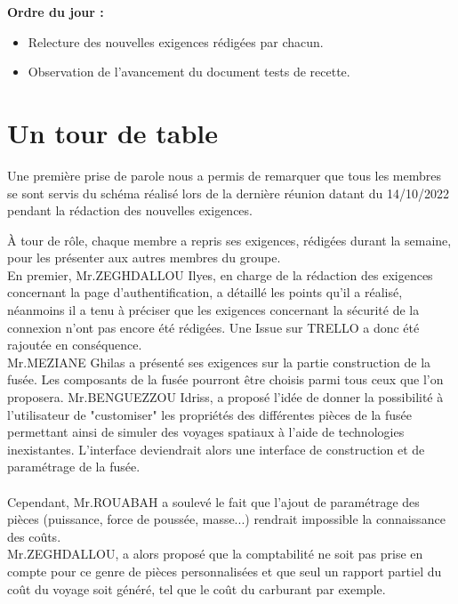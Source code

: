 \documentclass[a4paper, 12pt]{article}
\begin{document}
\textbf{Ordre du jour :}
 \begin{itemize}
     \item Relecture des nouvelles exigences rédigées par chacun. 
     \item Observation de l'avancement du document tests de recette.
 \end{itemize}


\section{Un tour de table}

Une première prise de parole nous a permis de remarquer que tous les membres se sont servis du schéma réalisé lors de la dernière réunion datant du 14/10/2022 pendant la rédaction des nouvelles exigences.

À tour de rôle, chaque membre a repris ses exigences, rédigées durant la semaine, pour les présenter aux autres membres du groupe.
\\

En premier, Mr.ZEGHDALLOU Ilyes, en charge de la rédaction des exigences concernant la page d'authentification, a détaillé les points qu'il a réalisé, néanmoins il a tenu à préciser que les exigences concernant la sécurité de la connexion n'ont pas encore été rédigées. Une Issue sur TRELLO a donc été rajoutée en conséquence. \\


Mr.MEZIANE Ghilas a présenté ses exigences sur la partie construction de la fusée. Les composants de la fusée pourront être choisis parmi tous ceux que l'on proposera. Mr.BENGUEZZOU Idriss, a proposé l'idée de donner la possibilité à l'utilisateur de "customiser" les propriétés des différentes pièces de la fusée permettant ainsi de simuler des voyages spatiaux à l'aide de technologies inexistantes. L'interface deviendrait alors une interface de construction et de paramétrage de la fusée. \\ \\ Cependant, Mr.ROUABAH a soulevé le fait que l'ajout de paramétrage des pièces (puissance, force de poussée, masse...) rendrait impossible la connaissance des coûts. \\
Mr.ZEGHDALLOU, a alors proposé que la comptabilité ne soit pas prise en compte pour ce genre de pièces personnalisées et que seul un rapport partiel du coût du voyage soit généré, tel que le coût du carburant par exemple. 
\\
\end{document}
